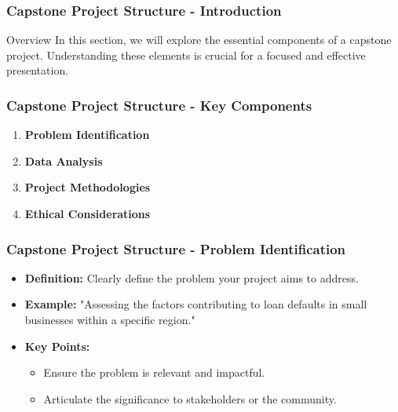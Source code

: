 \documentclass[aspectratio=169]{beamer}
\begin{document}
\begin{frame}[fragile]
  \frametitle{Capstone Project Structure - Introduction}
  \begin{block}{Overview}
    In this section, we will explore the essential components of a capstone project. 
    Understanding these elements is crucial for a focused and effective presentation.
  \end{block}
\end{frame}

\begin{frame}[fragile]
  \frametitle{Capstone Project Structure - Key Components}
  \begin{enumerate}
    \item \textbf{Problem Identification}
    \item \textbf{Data Analysis}
    \item \textbf{Project Methodologies}
    \item \textbf{Ethical Considerations}
  \end{enumerate}
\end{frame}

\begin{frame}[fragile]
  \frametitle{Capstone Project Structure - Problem Identification}
  \begin{itemize}
    \item \textbf{Definition:} Clearly define the problem your project aims to address.
    \item \textbf{Example:} "Assessing the factors contributing to loan defaults in small businesses within a specific region."
    \item \textbf{Key Points:}
      \begin{itemize}
        \item Ensure the problem is relevant and impactful.
        \item Articulate the significance to stakeholders or the community.
      \end{itemize}
  \end{itemize}
\end{frame}
\end{document}
